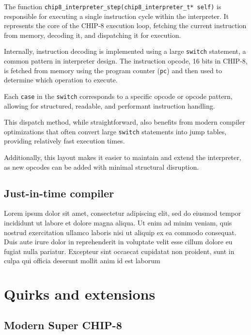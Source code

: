 \par The function \texttt{chip8\_interpreter\_step(chip8\_interpreter\_t* self)} is responsible for executing a single instruction cycle within the interpreter. It represents the core of the CHIP-8 execution loop, fetching the current instruction from memory, decoding it, and dispatching it for execution.

\par Internally, instruction decoding is implemented using a large \texttt{switch} statement, a common pattern in interpreter design. The instruction opcode, 16 bits in CHIP-8, is fetched from memory using the program counter (\texttt{pc}) and then used to determine which operation to execute.

\par Each \texttt{case} in the \texttt{switch} corresponds to a specific opcode or opcode pattern, allowing for structured, readable, and performant instruction handling.

\par This dispatch method, while straightforward, also benefits from modern compiler optimizations that often convert large \texttt{switch} statements into jump tables, providing relatively fast execution times.

\par Additionally, this layout makes it easier to maintain and extend the interpreter, as new opcodes can be added with minimal structural disruption.

\subsection{Just-in-time compiler}
\label{subsec:ch3sec3sub2}

\par Lorem ipsum dolor sit amet, consectetur adipiscing elit, sed do eiusmod tempor incididunt ut labore et dolore magna aliqua. Ut enim ad minim veniam, quis nostrud exercitation ullamco laboris nisi ut aliquip ex ea commodo consequat. Duis aute irure dolor in reprehenderit in voluptate velit esse cillum dolore eu fugiat nulla pariatur. Excepteur sint occaecat cupidatat non proident, sunt in culpa qui officia deserunt mollit anim id est laborum

\section{Quirks and extensions}
\label{sec:ch3sec4}

\subsection{Modern Super CHIP-8}
\label{subsec:ch3sec4sub1}

